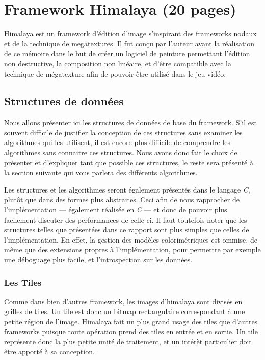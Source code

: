\chapter{Framework Himalaya (20 pages) }
	Himalaya est un framework d'édition d'image s'inspirant des frameworks nodaux et de la technique de megatextures. Il fut conçu par l'auteur avant la
	réalisation de ce mémoire dans le but de créer un logiciel de peinture permettant l'édition non destructive, la composition non linéaire, et d'être
	compatible avec la technique de mégatexture afin de pouvoir être utilisé dans le jeu vidéo. 


	\section{Structures de données}
		Nous allons présenter ici les structures de données de base du framework. S'il est souvent difficile de justifier la conception de ces structures
		sans examiner les algorithmes qui les utilisent, il est encore plus difficile de comprendre les algorithmes sans connaitre ces structures.
		Nous avons donc fait le choix de présenter et d'expliquer tant que possible ces structures, le reste sera présenté à la section suivante qui
		vous parlera des différents algorithmes.

		Les structures et les algorithmes seront également présentés dans le langage \emph{C}, plutôt que dans des formes plus abstraites. Ceci afin de nous
		rapprocher de l'implémentation --- également réalisée en \emph{C} --- et donc de pouvoir plus facilement discuter des performances de celle-ci. 
		Il faut toutefois noter que les structures telles que présentées dans ce rapport sont plus simples que celles de l'implémentation. En effet, 
		la gestion des modèles colorimétriques est ommise, de même que des extensions propres à l'implémentation, pour permettre par exemple une
		déboguage plus facile, et l'introspection sur les données. 

		\subsection{Les Tiles}
		Comme dans bien d'autres framework, les images d'himalaya sont divisés en grilles de tiles. Un tile est donc un bitmap rectangulaire correspondant
		à une petite région de l'image. Himalaya fait un plus grand usage des tiles que d'autres frameworks puisque toute opération prend des tiles
		en entrée et en sortie. Un tile représente donc la plus petite unité de traitement, et un intérèt particulier doit être apporté à sa conception.

